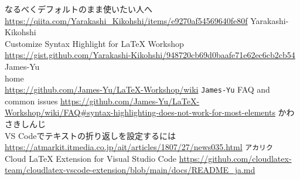 \documentclass{ltjsarticle}
\begin{document}
\begin{thebibliography}{999}
  なるべくデフォルトのまま使いたい人へ\\
  \url{https://qiita.com/Yarakashi_Kikohshi/items/e9270af54569640fe80f}
  Yarakashi-Kikohshi\\
  Customize Syntax Highlight for LaTeX Workshop\\
  \url{https://gist.github.com/Yarakashi-Kikohshi/948720cb69d0baafe71e62ec6cb2cb54}
  James-Yu\\
  home\\
  \url{https://github.com/James-Yu/LaTeX-Workshop/wiki}
  \verb|James-Yu|
  FAQ and common issues
  \url{https://github.com/James-Yu/LaTeX-Workshop/wiki/FAQ#syntax-highlighting-does-not-work-for-most-elements}
  かわさきしんじ\\
  VS Codeでテキストの折り返しを設定するには\\
  \url{https://atmarkit.itmedia.co.jp/ait/articles/1807/27/news035.html}
  \verb|アカリク|\\
  Cloud LaTeX Extension for Visual Studio Code
  \url{https://github.com/cloudlatex-team/cloudlatex-vscode-extension/blob/main/docs/README_ja.md}
\end{thebibliography}
\end{document}
